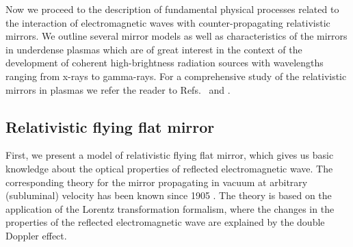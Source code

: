 \documentclass[10pt, a4paper, twoside, openright]{report}
\begin{document}
%

%

%

%

%

Now we proceed to the description of fundamental physical processes related to the interaction of electromagnetic waves with counter-propagating relativistic mirrors. We outline several mirror models as well as characteristics of the mirrors in underdense plasmas which are of great interest in the context of the development of coherent high-brightness radiation sources with wavelengths ranging from x-rays to gamma-rays. For a comprehensive study of the relativistic mirrors in plasmas we refer the reader to Refs.~ and .


\subsection{Relativistic flying flat mirror\label{sec:rffm}}


First, we present a model of relativistic flying flat mirror, which gives us basic knowledge about the optical properties of reflected electromagnetic wave. The corresponding theory for the mirror propagating in vacuum at arbitrary (subluminal) velocity has been known since 1905 \cite{Einstein1905}. The theory is based on the application of the Lorentz transformation formalism, where the changes in the properties of the reflected electromagnetic wave are explained by the double Doppler effect.
\end{document}
